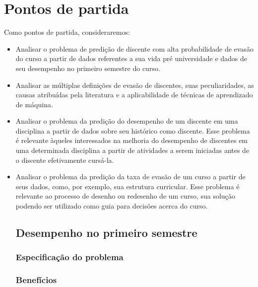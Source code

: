 \chapter{Pontos de partida}

Como pontos de partida, consideraremos:

\begin{itemize}

\item Analisar o problema de predição de discente com alta probabilidade de evasão do curso a partir de dados referentes a sua vida pré universidade e dados de seu desempenho no primeiro semestre do curso.

\item Analisar as múltiplas definições de evasão de discentes, suas peculiaridades, as causas atribuídas pela literatura e a aplicabilidade de técnicas de aprendizado de máquina.

\item Analisar o problema da predição do desempenho de um discente em uma disciplina a partir de dados sobre seu histórico como discente. Esse problema é relevante àqueles interessados na melhoria do desempenho de discentes em uma determinada disciplina a partir de atividades a serem iniciadas antes de o discente efetivamente cursá-la.

\item Analisar o problema da predição da taxa de evasão de um curso a partir de seus dados, como, por exemplo, sua estrutura curricular. Esse problema é relevante ao processo de desenho ou redesenho de um curso, sua solução podendo ser utilizado como guia para decisões acerca do curso.

\section{Desempenho no primeiro semestre}
\subsection*{Especificação do problema}
\subsection*{Benefícios}

\end{itemize}


